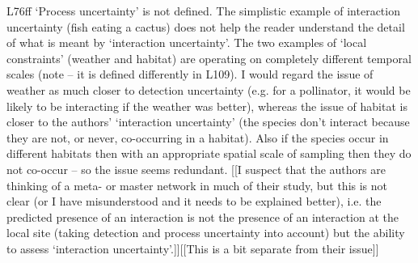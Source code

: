 \documentclass[12pt]{letter}
\newenvironment{refquote}{\bigskip \begin{it}}{\end{it}\smallskip}
\begin{document}
\begin{itemize}
		\begin{refquote}
		L76ff ‘Process uncertainty’ is not defined. The simplistic example of interaction uncertainty (fish eating a cactus) does not help the reader understand the detail of what is meant by ‘interaction uncertainty’. The two examples of ‘local constraints’ (weather and habitat) are operating on completely different temporal scales (note – it is defined differently in L109). I would regard the issue of weather as much closer to detection uncertainty (e.g. for a pollinator, it would be likely to be interacting if the weather was better), whereas the issue of habitat is closer to the authors’ ‘interaction uncertainty’ (the species don’t interact because they are not, or never, co-occurring in a habitat). Also if the species occur in different habitats then with an appropriate spatial scale of sampling then they do not co-occur – so the issue seems redundant. [[I suspect that the authors are thinking of a meta- or master network in much of their study, but this is not clear (or I have misunderstood and it needs to be explained better), i.e. the predicted presence of an interaction is not the presence of an interaction at the local site (taking detection and process uncertainty into account) but the ability to assess ‘interaction uncertainty’.]][[This is a bit separate from their issue]]
		\end{refquote}



\end{itemize}
\end{document}
